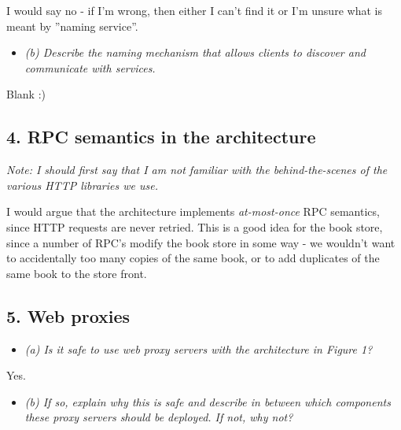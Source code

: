 \noindent I would say no - if I'm wrong, then either I can't find it or I'm unsure what
is meant by ''naming service''.

\begin{itemize}
  \item \textit{(b) Describe the naming mechanism that allows clients to discover and
  communicate with services.}
\end{itemize}

\noindent Blank :)




\streg


\subsection{4. RPC semantics in the architecture}

\noindent \textit{Note: I should first say that I am not familiar with the behind-the-scenes of the
various  HTTP libraries we use.} \medskip

I would argue that the architecture implements \textit{at-most-once} RPC
semantics, since HTTP requests are never retried. This is a good idea for the
book store, since a number of RPC's modify the book store in some way - we
wouldn't want to accidentally too many copies of the same book, or to add
duplicates of the same book to the store front.

\streg


\subsection{5. Web proxies}

\begin{itemize}
  \item \textit{(a) Is it safe to use web proxy servers with the architecture in
  Figure 1?}
\end{itemize}

\noindent Yes.

\begin{itemize}
  \item \textit{(b) If so, explain why this is safe and describe in between which
  components these proxy servers should be deployed. If not, why not?}
\end{itemize}


